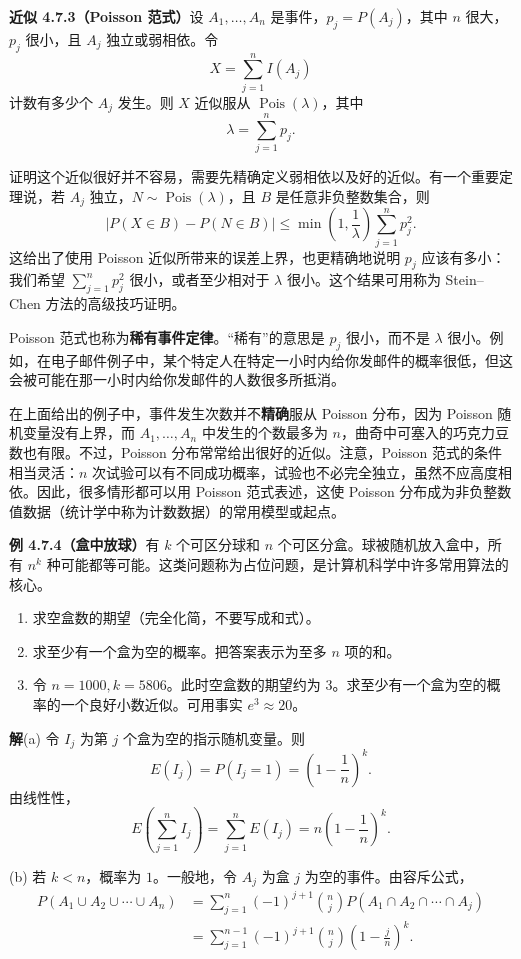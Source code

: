 \documentclass[UTF8, 12pt, fontset=fandol, oneside]{ctexart}
\begin{document}
\noindent\textbf{近似 4.7.3（Poisson 范式）}\quad 设 $A_1,\ldots,A_n$ 是事件，$p_j=P(A_j)$，其中 $n$ 很大，$p_j$ 很小，且 $A_j$ 独立或弱相依。令
\[
  X=\sum_{j=1}^n I(A_j)
\]
计数有多少个 $A_j$ 发生。则 $X$ 近似服从 $\operatorname{Pois}(\lambda)$，其中
\[
  \lambda=\sum_{j=1}^n p_j.
\]

证明这个近似很好并不容易，需要先精确定义弱相依以及好的近似。有一个重要定理说，若 $A_j$ 独立，$N\sim\operatorname{Pois}(\lambda)$，且 $B$ 是任意非负整数集合，则
\[
  |P(X\in B)-P(N\in B)|
  \le \min\left(1,\frac{1}{\lambda}\right)\sum_{j=1}^n p_j^2.
\]
这给出了使用 Poisson 近似所带来的误差上界，也更精确地说明 $p_j$ 应该有多小：我们希望 $\sum_{j=1}^n p_j^2$ 很小，或者至少相对于 $\lambda$ 很小。这个结果可用称为 Stein--Chen 方法的高级技巧证明。

Poisson 范式也称为\textbf{稀有事件定律}。“稀有”的意思是 $p_j$ 很小，而不是 $\lambda$ 很小。例如，在电子邮件例子中，某个特定人在特定一小时内给你发邮件的概率很低，但这会被可能在那一小时内给你发邮件的人数很多所抵消。

在上面给出的例子中，事件发生次数并不\textbf{精确}服从 Poisson 分布，因为 Poisson 随机变量没有上界，而 $A_1,\ldots,A_n$ 中发生的个数最多为 $n$，曲奇中可塞入的巧克力豆数也有限。不过，Poisson 分布常常给出很好的近似。注意，Poisson 范式的条件相当灵活：$n$ 次试验可以有不同成功概率，试验也不必完全独立，虽然不应高度相依。因此，很多情形都可以用 Poisson 范式表述，这使 Poisson 分布成为非负整数值数据（统计学中称为计数数据）的常用模型或起点。

\noindent\textbf{例 4.7.4（盒中放球）}\quad 有 $k$ 个可区分球和 $n$ 个可区分盒。球被随机放入盒中，所有 $n^k$ 种可能都等可能。这类问题称为占位问题，是计算机科学中许多常用算法的核心。

\begin{enumerate}
  \item[(a)] 求空盒数的期望（完全化简，不要写成和式）。
  \item[(b)] 求至少有一个盒为空的概率。把答案表示为至多 $n$ 项的和。
  \item[(c)] 令 $n=1000,k=5806$。此时空盒数的期望约为 $3$。求至少有一个盒为空的概率的一个良好小数近似。可用事实 $e^3\approx 20$。
\end{enumerate}

\noindent\textbf{解}\quad (a) 令 $I_j$ 为第 $j$ 个盒为空的指示随机变量。则
\[
  E(I_j)=P(I_j=1)=\left(1-\frac{1}{n}\right)^k.
\]
由线性性，
\[
  E\left(\sum_{j=1}^n I_j\right)
  =\sum_{j=1}^nE(I_j)
  =n\left(1-\frac{1}{n}\right)^k.
\]

(b) 若 $k<n$，概率为 $1$。一般地，令 $A_j$ 为盒 $j$ 为空的事件。由容斥公式，
\[
\begin{aligned}
  P(A_1\cup A_2\cup\cdots\cup A_n)
  &=\sum_{j=1}^n(-1)^{j+1}\binom{n}{j}P(A_1\cap A_2\cap\cdots\cap A_j)\\
  &=\sum_{j=1}^{n-1}(-1)^{j+1}\binom{n}{j}\left(1-\frac{j}{n}\right)^k.
\end{aligned}
\]
\end{document}
